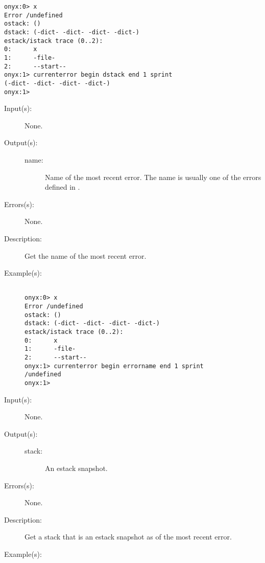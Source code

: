 \begin{description}
\begin{description}
\begin{verbatim}
onyx:0> x
Error /undefined
ostack: ()
dstack: (-dict- -dict- -dict- -dict-)
estack/istack trace (0..2):
0:      x
1:      -file-
2:      --start--
onyx:1> currenterror begin dstack end 1 sprint
(-dict- -dict- -dict- -dict-)
onyx:1>
		\end{verbatim}
	\end{description}
\label{currenterror:errorname}
\item[{\onyxop{--}{errorname}{name}}: ]
	\begin{description}\item[]
	\item[Input(s): ] None.
	\item[Output(s): ]
		\begin{description}\item[]
		\item[name: ]
			Name of the most recent error.  The name is usually one
			of the errors defined in
			.
		\end{description}
	\item[Errors(s): ] None.
	\item[Description: ]
		Get the name of the most recent error.
	\item[Example(s): ]\begin{verbatim}

onyx:0> x
Error /undefined
ostack: ()
dstack: (-dict- -dict- -dict- -dict-)
estack/istack trace (0..2):
0:      x
1:      -file-
2:      --start--
onyx:1> currenterror begin errorname end 1 sprint
/undefined
onyx:1>
		\end{verbatim}
	\end{description}
\label{currenterror:estack}
\item[{\onyxop{--}{estack}{stack}}: ]
	\begin{description}\item[]
	\item[Input(s): ] None.
	\item[Output(s): ]
		\begin{description}\item[]
		\item[stack: ]
			An estack snapshot.
		\end{description}
	\item[Errors(s): ] None.
	\item[Description: ]
		Get a stack that is an estack snapshot as of the most recent
		error.
	\item[Example(s): ]\begin{verbatim}


\end{verbatim}
\end{description}
\end{description}
